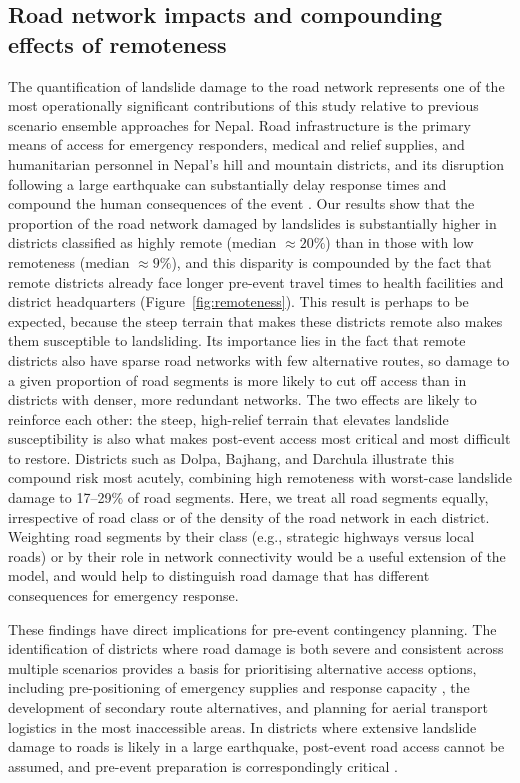 \documentclass[preprint,12pt,authoryear]{elsarticle}
\begin{document}
\subsection{Road network impacts and compounding effects of remoteness}

The quantification of landslide damage to the road network represents one of the most operationally significant contributions of this study relative to previous scenario ensemble approaches for Nepal. Road infrastructure is the primary means of access for emergency responders, medical and relief supplies, and humanitarian personnel in Nepal's hill and mountain districts, and its disruption following a large earthquake can substantially delay response times and compound the human consequences of the event \citep{Koks2019, NationalPlanningCommission2015}. Our results show that the proportion of the road network damaged by landslides is substantially higher in districts classified as highly remote (median $\approx 20\%$) than in those with low remoteness (median $\approx 9\%$), and this disparity is compounded by the fact that remote districts already face longer pre-event travel times to health facilities and district headquarters (Figure~\ref{fig:remoteness}). This result is perhaps to be expected, because the steep terrain that makes these districts remote also makes them susceptible to landsliding. Its importance lies in the fact that remote districts also have sparse road networks with few alternative routes, so damage to a given proportion of road segments is more likely to cut off access than in districts with denser, more redundant networks. The two effects are likely to reinforce each other: the steep, high-relief terrain that elevates landslide susceptibility is also what makes post-event access most critical and most difficult to restore. Districts such as Dolpa, Bajhang, and Darchula illustrate this compound risk most acutely, combining high remoteness with worst-case landslide damage to 17--29\% of road segments. Here, we treat all road segments equally, irrespective of road class or of the density of the road network in each district. Weighting road segments by their class (e.g., strategic highways versus local roads) or by their role in network connectivity would be a useful extension of the model, and would help to distinguish road damage that has different consequences for emergency response.

These findings have direct implications for pre-event contingency planning. The identification of districts where road damage is both severe and consistent across multiple scenarios provides a basis for prioritising alternative access options, including pre-positioning of emergency supplies and response capacity \citep{sijapati2025}, the development of secondary route alternatives, and planning for aerial transport logistics in the most inaccessible areas. In districts where extensive landslide damage to roads is likely in a large earthquake, post-event road access cannot be assumed, and pre-event preparation is correspondingly critical \citep{IASC2007}.
\end{document}
